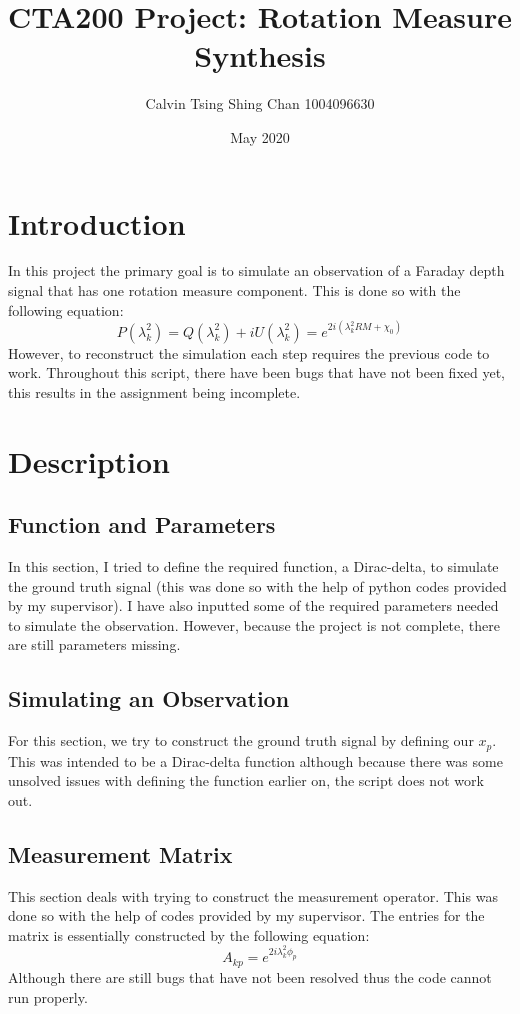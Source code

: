 \documentclass{article}
\title{CTA200 Project: Rotation Measure Synthesis}
\author{Calvin Tsing Shing Chan 1004096630 }
\date{May 2020}
\begin{document}
\maketitle

\section{Introduction}
In this project the primary goal is to simulate an observation of a Faraday depth signal that has one rotation measure component. This is done so with the following equation: 
\begin{equation}
P(\lambda_{k}^2)=Q(\lambda_{k}^2)+iU(\lambda_{k}^2)=e^{2i(\lambda_{k}^2RM+\chi_{0})}
\end{equation}
However, to reconstruct the simulation each step requires the previous code to work. Throughout this script, there have been bugs that have not been fixed yet, this results in the assignment being incomplete. 
\section{Description}
\subsection{Function and Parameters}
In this section, I tried to define the required function, a Dirac-delta, to simulate the ground truth signal (this was done so with the help of python codes provided by my supervisor). I have also inputted some of the required parameters needed to simulate the observation. However, because the project is not complete, there are still parameters missing.
\subsection{Simulating an Observation}
For this section, we try to construct the ground truth signal by defining our $x_{p}$. This was intended to be a Dirac-delta function although because there was some unsolved issues with defining the function earlier on, the script does not work out. 
\subsection{Measurement Matrix}
This section deals with trying to construct the measurement operator. This was done so with the help of codes provided by my supervisor. The entries for the matrix is essentially constructed by the following equation:
\begin{equation}
A_{kp}=e^{2i\lambda_{k}^2\phi_{p}}
\end{equation}
Although there are still bugs that have not been resolved thus the code cannot run properly. 
\end{document}
